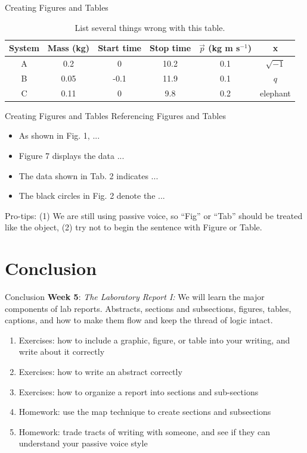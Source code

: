 \documentclass{beamer}
\begin{document}
\begin{frame}[fragile]{Creating Figures and Tables}
\small
\begin{table}
\centering
\begin{tabular}{| c | c | c | c | c | c |}
\hline
\hline
System & Mass (kg) & Start time & Stop time & $\vec{p}$ (kg m s$^{-1}$) & x \\ \hline
A & 0.2 & 0 & 10.2 & 0.1 & $\sqrt{-1}$ \\ \hline
B & 0.05 & -0.1 & 11.9 & 0.1 & $q$ \\ \hline
C & 0.11 & 0 & 9.8 & 0.2 & elephant \\ \hline
\hline
\end{tabular}
\caption{\label{tab:lang} List several things wrong with this table.}
\end{table}
\end{frame}

\begin{frame}{Creating Figures and Tables}
\alert{Referencing} Figures and Tables
\begin{itemize}
\item As shown in Fig. 1, ...
\item Figure 7 displays the data ...
\item The data shown in Tab. 2 indicates ...
\item The black circles in Fig. 2 denote the ...
\end{itemize}
Pro-tips: (1) We are still using passive voice, so ``Fig'' or ``Tab'' should be treated like the object, (2) try not to begin the sentence with Figure or Table.
\end{frame}

\section{Conclusion}

\begin{frame}{Conclusion}
\small
\textbf{Week 5}: \textit{The Laboratory Report I:} We will learn the major components of lab reports.  Abstracts, sections and subsections, figures, tables, captions, and how to make them flow and keep the thread of logic intact.
\begin{enumerate}
\item Exercises: how to include a graphic, figure, or table into your writing, and write about it correctly
\item Exercises: how to write an abstract correctly
\item Exercises: how to organize a report into sections and sub-sections
\item Homework: use the map technique to create sections and subsections
\item Homework: trade tracts of writing with someone, and see if they can understand your passive voice style
\end{enumerate}
\end{frame}
\end{document}
